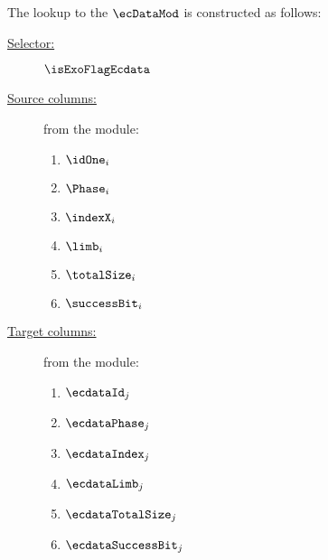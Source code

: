 The lookup to the $\ecDataMod$ is constructed as follows:
\begin{description}
	\item[\underline{Selector:}] $\isExoFlagEcdata$
	\item[\underline{Source columns:}] from the \mmioMod{} module:
		\begin{multicols}{3}
			\begin{enumerate}
				\item $\idOne      _{i}$
				\item $\Phase      _{i}$
				\item $\indexX     _{i}$
				\item $\limb       _{i}$
				\item $\totalSize  _{i}$
				\item $\successBit _{i}$
			\end{enumerate}
		\end{multicols}
	\item[\underline{Target columns:}] from the \ecDataMod{} module: 
			\begin{multicols}{3}
				\begin{enumerate}
					\item $\ecdataId    _{j}$
					\item $\ecdataPhase _{j}$
					\item $\ecdataIndex _{j}$
					\item $\ecdataLimb  _{j}$
					\item $\ecdataTotalSize  _{j}$
					\item $\ecdataSuccessBit _{j}$
				\end{enumerate}
			\end{multicols}
\end{description}
